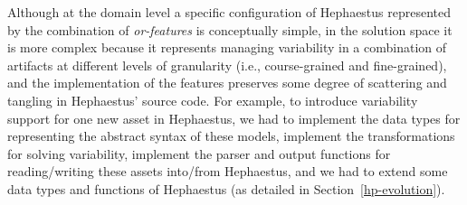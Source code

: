 Although at the domain level a specific configuration of Hephaestus represented by the combination of \textit{or-features} is conceptually simple, in the solution space it is more complex because it represents managing variability in a combination of artifacts at different levels of granularity (i.e., course-grained and fine-grained), and the implementation of the features preserves some degree of scattering and tangling in Hephaestus' source code.
For example, to introduce variability support for one new asset in Hephaestus, we had to implement the
data types for representing the abstract syntax of these models, implement the transformations for solving variability,
implement the parser and output functions for reading/writing these assets into/from Hephaestus, and we had to extend some data types and functions of Hephaestus (as detailed in Section~\ref{hp-evolution}).




